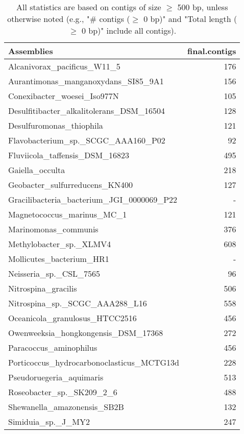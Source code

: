 \documentclass[12pt,a4paper]{article}
\begin{document}
\begin{table}[ht]
\begin{center}
\caption{All statistics are based on contigs of size $\geq$ 500 bp, unless otherwise noted (e.g., "\# contigs ($\geq$ 0 bp)" and "Total length ($\geq$ 0 bp)" include all contigs).}
\begin{tabular}{|l*{1}{|r}|}
\hline
Assemblies & final.contigs \\ \hline
Alcanivorax\_pacificus\_W11\_5 & 176 \\ \hline
Aurantimonas\_manganoxydans\_SI85\_9A1 & 156 \\ \hline
Conexibacter\_woesei\_Iso977N & 105 \\ \hline
Desulfitibacter\_alkalitolerans\_DSM\_16504 & 128 \\ \hline
Desulfuromonas\_thiophila & 121 \\ \hline
Flavobacterium\_sp.\_SCGC\_AAA160\_P02 & 92 \\ \hline
Fluviicola\_taffensis\_DSM\_16823 & 495 \\ \hline
Gaiella\_occulta & 218 \\ \hline
Geobacter\_sulfurreducens\_KN400 & 127 \\ \hline
Gracilibacteria\_bacterium\_JGI\_0000069\_P22 & - \\ \hline
Magnetococcus\_marinus\_MC\_1 & 121 \\ \hline
Marinomonas\_communis & 376 \\ \hline
Methylobacter\_sp.\_XLMV4 & 608 \\ \hline
Mollicutes\_bacterium\_HR1 & - \\ \hline
Neisseria\_sp.\_CSL\_7565 & 96 \\ \hline
Nitrospina\_gracilis & 506 \\ \hline
Nitrospina\_sp.\_SCGC\_AAA288\_L16 & 558 \\ \hline
Oceanicola\_granulosus\_HTCC2516 & 456 \\ \hline
Owenweeksia\_hongkongensis\_DSM\_17368 & 272 \\ \hline
Paracoccus\_aminophilus & 456 \\ \hline
Porticoccus\_hydrocarbonoclasticus\_MCTG13d & 228 \\ \hline
Pseudoruegeria\_aquimaris & 513 \\ \hline
Roseobacter\_sp.\_SK209\_2\_6 & 488 \\ \hline
Shewanella\_amazonensis\_SB2B & 132 \\ \hline
Simiduia\_sp.\_J\_MY2 & 247 \\ \hline

\end{tabular}
\end{center}
\end{table}
\end{document}
